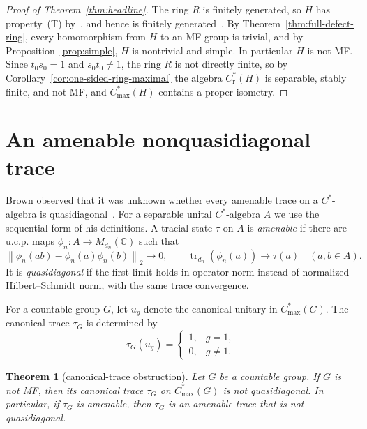 \documentclass[11pt]{amsart}
\newcommand{\leanverified}[2]{\ignorespaces}
\newtheorem{theorem}{Theorem}[section]
\theoremstyle{plain}
\newcommand{\C}{\mathbb C}
\newcommand{\tr}{\operatorname{tr}}
\newcommand{\hsnorm}[1]{\left\lVert #1\right\rVert_2}
\begin{document}
\begin{proof}[Proof of Theorem~\ref{thm:headline}]
The ring $R$ is finitely generated, so $H$ has property~\textup{(T)}
by~\cite[Theorem~1.1]{EJZ}, and hence is finitely
generated~\cite[Theorem~1.3.1]{BHV}.  By
Theorem~\ref{thm:full-defect-ring}, every homomorphism from $H$ to an MF
group is trivial, and by Proposition~\ref{prop:simple}, $H$ is nontrivial
and simple.  In particular $H$ is not MF\@.  Since $t_0s_0=1$ and
$s_0t_0\ne1$, the ring $R$ is not directly finite, so by
Corollary~\ref{cor:one-sided-ring-maximal} the algebra
$C^*_{\mathrm r}(H)$ is separable, stably finite, and not MF, and
$C^*_{\max}(H)$ contains a proper isometry.
\end{proof}

\section{An amenable nonquasidiagonal trace}
\label{sec:amenable-nonqd}

Brown observed that it was unknown whether every amenable trace on a
$C^*$-algebra is quasidiagonal~\cite[discussion preceding
Proposition~3.5.1]{Brown}.  For a separable unital $C^*$-algebra $A$ we
use the sequential form of his definitions.  A tracial state $\tau$ on
$A$ is \emph{amenable} if there are u.c.p. maps
$\phi_n\colon A\to M_{d_n}(\C)$ such that
\[
 \hsnorm{\phi_n(ab)-\phi_n(a)\phi_n(b)}\longrightarrow0,
 \qquad \tr_{d_n}(\phi_n(a))\longrightarrow\tau(a)
 \quad(a,b\in A).
\]
It is \emph{quasidiagonal} if the first limit holds in operator norm instead
of normalized Hilbert--Schmidt norm, with the same trace convergence.

For a countable group $G$, let $u_g$ denote the canonical unitary in
$C^*_{\max}(G)$.  The canonical trace $\tau_G$ is
determined by
\[
 \tau_G(u_g)=\begin{cases}1,&g=1,\\0,&g\ne1.\end{cases}
\]

\begin{theorem}[canonical-trace obstruction]
\label{thm:factorization-nonmf-trace}
Let $G$ be a countable group.  If $G$ is not MF, then its canonical trace
$\tau_G$ on $C^*_{\max}(G)$ is not quasidiagonal.  In particular, if
$\tau_G$ is amenable, then $\tau_G$ is an amenable trace that is not
quasidiagonal.
\leanverified{Manuscript/NinetyNineProblems/ProblemXGroups}{GroupApproximation.NinetyNineProblems.manuscriptCanonicalMaximalTraceNotIsQuasidiagonalTraceOfNotIsOperatorMF}
\leanverified{Manuscript/NinetyNineProblems/ProblemXGroups}{GroupApproximation.NinetyNineProblems.canonicalMaximalTrace_amenable_not_isQuasidiagonalTrace_of_not_isOperatorMF}
\end{theorem}
\end{document}
